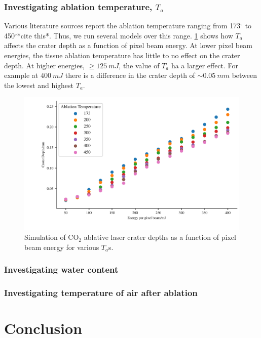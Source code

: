\subsubsection{Investigating ablation temperature, $T_a$}

Various literature sources report the ablation temperature ranging from 173$^{\circ}$ to 450$^{\circ}$*cite this*. Thus, we run several models over this range. \cref{fig:ta} shows how $T_a$ affects the crater depth as a function of pixel beam energy. At lower pixel beam energies, the tissue ablation temperature has little to no effect on the crater depth. At higher energies, $\geq 125~mJ$, the value of $T_a$ ha a larger effect. For example at $400~mJ$ there is a difference in the crater depth of $\sim0.05~mm$  between the lowest and highest $T_a$.



\begin{figure}
	\centering
    \includegraphics[width=\columnwidth]{./ablation/images/ta.pdf}
    \caption{Simulation of CO$_2$ ablative laser crater depths as a function of pixel beam energy for various $T_a$s.}\label{fig:ta}
\end{figure}
 

\subsubsection{Investigating water content}
 
\subsubsection{Investigating temperature of air after ablation} 
 
\section{Conclusion}